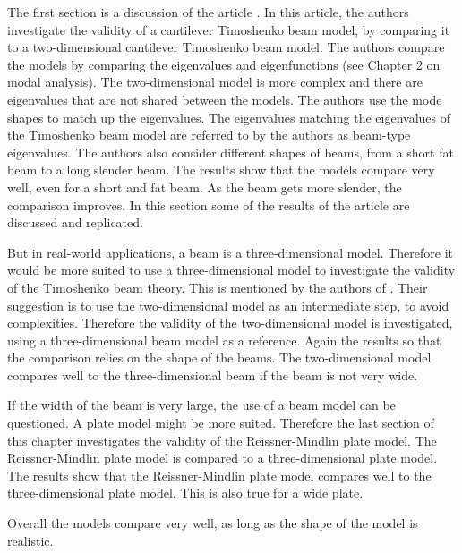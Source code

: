 \documentclass[../main.tex]{subfiles}
\begin{document}
The first section is a discussion of the article \cite{LVV09}. In this article, the authors investigate the validity of a cantilever Timoshenko beam model, by comparing it to a two-dimensional cantilever Timoshenko beam model. The authors compare the models by comparing the eigenvalues and eigenfunctions (see Chapter 2 on modal analysis). The two-dimensional model is more complex and there are eigenvalues that are not shared between the models. The authors use the mode shapes to match up the eigenvalues. The eigenvalues matching the eigenvalues of the Timoshenko beam model are referred to by the authors as beam-type eigenvalues. The authors also consider different shapes of beams, from a short fat beam to a long slender beam. The results show that the models compare very well, even for a short and fat beam. As the beam gets more slender, the comparison improves. In this section some of the results of the article are discussed and replicated.

But in real-world applications, a beam is a three-dimensional model. Therefore it would be more suited to use a three-dimensional model to investigate the validity of the Timoshenko beam theory. This is mentioned by the authors of \cite{LVV09}. Their suggestion is to use the two-dimensional model as an intermediate step, to avoid complexities. Therefore the validity of the two-dimensional model is investigated, using a three-dimensional beam model as a reference. Again the results so that the comparison relies on the shape of the beams. The two-dimensional model compares well to the three-dimensional beam if the beam is not very wide. 

If the width of the beam is very large, the use of a beam model can be questioned. A plate model might be more suited. Therefore the last section of this chapter investigates the validity of the Reissner-Mindlin plate model. The Reissner-Mindlin plate model is compared to a three-dimensional plate model. The results show that the Reissner-Mindlin plate model compares well to the three-dimensional plate model. This is also true for a wide plate. 

Overall the models compare very well, as long as the shape of the model is realistic. 
\end{document}

